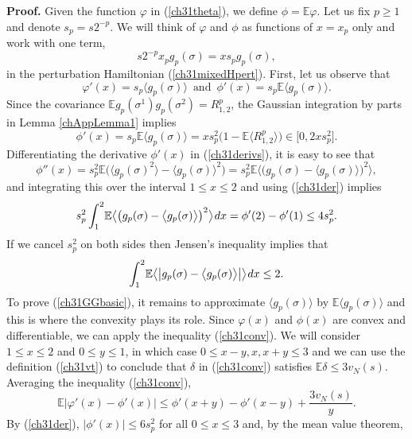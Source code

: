 \documentclass[12pt]{article}
\newcommand{\smsp}{\hspace{0.3mm}}
\newcommand{\e}{\mathbb{E}}
\newcommand{\la}{\langle}
\newcommand{\ra}{\rangle}
\theoremstyle{nonumberplain}
\begin{document}
\noindent\textbf{Proof.} Given the function $\varphi$ in (\ref{ch31theta}), we define $\phi = \e \varphi.$ Let us fix $p\geq 1$ and denote $s_p = s 2^{-p}$. We will think of $\varphi$ and $\phi$ as functions of $x=x_p$ only and work with one term, 
$$
s2^{-p} x_p g_p(\sigma) = xs_p g_p(\sigma),
$$
in the perturbation Hamiltonian (\ref{ch31mixedHpert}). First, let us observe that
\begin{equation}
\varphi'(x)=s_p \bigl\la g_p(\sigma)\bigr\ra
\,\mbox{ and }\,
\phi'(x)=s_p \e\bigl\la g_p(\sigma)\bigr\ra.
\label{ch31derivs}
\end{equation}
Since the covariance $\e g_p(\sigma^1) g_p(\sigma^2) = R_{1,2}^p$, the Gaussian integration by parts in Lemma \ref{chAppLemma1} implies
\begin{equation}
\phi'(x)=s_p \e\bigl\la g_p(\sigma)\bigr\ra
=  x s_p^2 \bigl(1-\e \bigl\la R_{1,2}^p \bigr\ra\bigr)
\in \bigl[0, 2x s_p^2 \bigr].
\label{ch31der}
\end{equation}
Differentiating the derivative $\phi'(x)$ in (\ref{ch31derivs}), it is easy to see that
$$
\phi''(x)= s_p^2 \e \bigl( \bigl\la g_p(\sigma)^2 \bigr\ra - \bigl\la g_p(\sigma)\bigr\ra^2\bigr)
= s_p^2 \e\bigl\la \bigl(g_p(\sigma) - \bigl\la g_p(\sigma)\bigr\ra\bigr)^2\bigr\ra,
$$
and integrating this over the interval $1\leq x\leq 2$ and using (\ref{ch31der}) implies
$$
s_p^2 
\int_{1}^{2}\! \e\bigl\la \bigl(g_p(\sigma) - \bigl\la g_p(\sigma) \bigr\ra\bigr)^2\bigr\ra \smsp dx
=\phi'(2)-\phi'(1)\leq 4 s_p^2.
$$
If we cancel $s_p^2$ on both sides then Jensen's inequality implies that 
\begin{equation}
\int_{1}^{2}\! \e\bigl\la \bigl|g_p(\sigma) - \bigl\la g_p(\sigma)\bigr\ra\bigr| \bigr\ra \smsp dx \leq 2.
\label{ch31step2}
\end{equation}
To prove (\ref{ch31GGbasic}), it remains to approximate $\la g_p(\sigma)\ra$ by $\e\la g_p(\sigma)\ra$ and this is where the convexity plays its role. Since $\varphi(x)$ and $\phi(x)$ are convex and differentiable, we can apply the inequality (\ref{ch31conv}). We will consider $1\leq x\leq 2$ and $0\leq y\leq 1$, in which case $0\leq x-y,x,x+y\leq 3$ and we can use the definition (\ref{ch31vt}) to conclude that $\delta$ in (\ref{ch31conv}) satisfies $\e \delta \leq 3v_N(s)$. Averaging the inequality (\ref{ch31conv}), 
\begin{equation}
\e|\varphi'(x)-\phi'(x)| 
\leq
\phi'(x+y) -\phi'(x-y) 
+ \frac{3v_N(s)}{y}.
\label{ch31etheta3vt}
\end{equation}
By (\ref{ch31der}), $|\phi'(x)| \leq 6s_p^2$ for all $0\leq x\leq 3$ and, by the mean value theorem,
\end{document}

